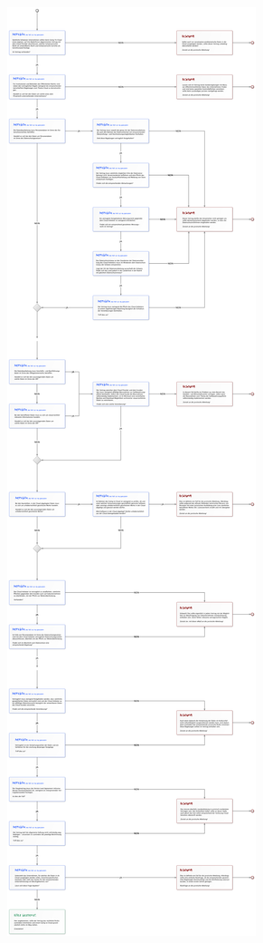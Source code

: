 \documentclass[a4paper,pointlessnumbers]{scrreprt}
\begin{document}
\begin{center}
\includegraphics[width=\textwidth]{images/flussdiagramm03.pdf}
\end{center}
\end{document}
